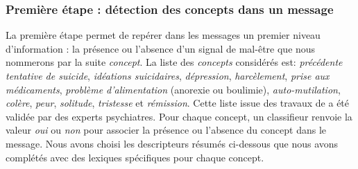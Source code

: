 \subsubsection{Première étape : détection des concepts dans un message}\label{etape1}

La première étape permet de repérer dans les messages un premier niveau d'information :   la présence ou l'absence d'un signal de mal-être que nous nommerons par la suite \emph{concept}. La liste des \emph{concepts} considérés est: \emph{précédente tentative de suicide}, \emph{idéations suicidaires}, \emph{dépression}, \emph{harcèlement}, \emph{prise aux médicaments}, \emph{problème d'alimentation} (anorexie ou boulimie), \emph{auto-mutilation}, \emph{colère}, \emph{peur}, \emph{solitude}, \emph{tristesse} et  \emph{rémission}. Cette liste issue des travaux de \cite{Plutchik1994} a été validée par des experts psychiatres. Pour chaque concept, un classifieur renvoie la valeur \emph{oui} ou \emph{non} pour associer la présence ou l'absence du concept dans le message. 
Nous avons choisi  les descripteurs résumés ci-dessous que nous avons complétés avec des lexiques spécifiques pour chaque concept. 

